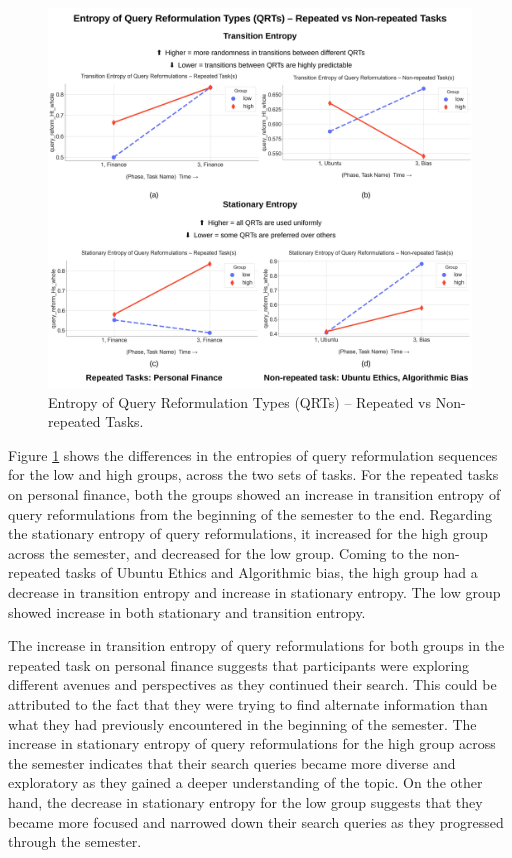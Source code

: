 \documentclass[letterpaper, nobind]{templates/ociamthesis}
\begin{document}
\begin{figure}

{\centering \includegraphics[width=1\linewidth]{figs/rp13-qrt-entropy} 

}

\caption[Entropy of Query Reformulation Types (QRTs) -- Repeated vs Non-repeated Tasks.]{Entropy of Query Reformulation Types (QRTs) -- Repeated vs Non-repeated Tasks.}\label{fig:rp13-qrt-entropy}
\end{figure}





Figure \ref{fig:rp13-qrt-entropy} shows the differences in the entropies of query reformulation sequences for the low and high groups, across the two sets of tasks.
For the repeated tasks on personal finance, both the groups showed an increase in transition entropy of query reformulations from the beginning of the semester to the end.
Regarding the stationary entropy of query reformulations, it increased for the high group across the semester, and decreased for the low group.
Coming to the non-repeated tasks of Ubuntu Ethics and Algorithmic bias, the high group had a decrease in transition entropy and increase in stationary entropy. The low group showed increase in both stationary and transition entropy.

The increase in transition entropy of query reformulations for both groups in the repeated task on personal finance suggests that participants were exploring different avenues and perspectives as they continued their search. This could be attributed to the fact that they were trying to find alternate information than what they had previously encountered in the beginning of the semester.
The increase in stationary entropy of query reformulations for the high group across the semester indicates that their search queries became more diverse and exploratory as they gained a deeper understanding of the topic. On the other hand, the decrease in stationary entropy for the low group suggests that they became more focused and narrowed down their search queries as they progressed through the semester.
\end{document}

